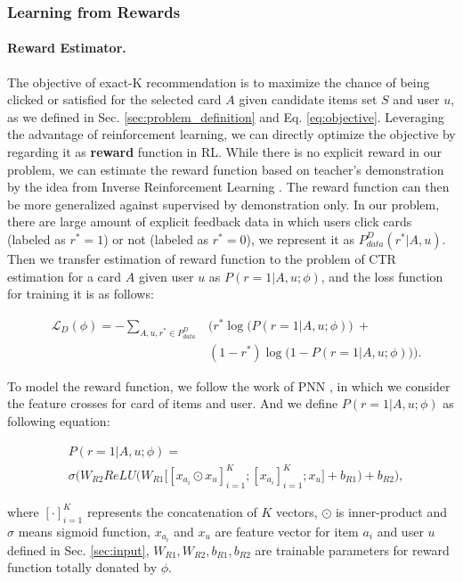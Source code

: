 \subsubsection{Learning from Rewards}
\label{sec:reinforce}
\paragraph{Reward Estimator.}
The objective of exact-K recommendation is to maximize the chance of being clicked or satisfied for the selected card $A$ given candidate items set $S$ and user $u$,
as we defined in Sec. \ref{sec:problem_definition} and Eq. \ref{eq:objective}.
Leveraging the advantage of reinforcement learning, we can directly optimize the objective by regarding it as \textbf{reward} function in RL.
While there is no explicit reward in our problem, 
we can estimate the reward function based on teacher's demonstration by the idea from Inverse Reinforcement Learning \cite{abbeel2004apprenticeship}.
The reward function can then be more generalized against supervised by demonstration only.
In our problem, there are large amount of explicit feedback data in which users click cards (labeled as $r^*=1$) or not (labeled as $r^*=0$),
we represent it as $P_{data}^{D}(r^*|A,u)$.
Then we transfer estimation of reward function to the problem of CTR estimation for a card $A$ given user $u$ as $P(r=1|A,u;\phi)$,
and the loss function for training it is as follows:
\begin{small}
\begin{eqnarray}
	& \mathcal{L}_{D}(\phi)=-\sum_{A,u,r^*\in P_{data}^{D}}&\Big(r^*\log\big(P(r=1|A,u;\phi)\big)\ + \\
	& & (1-r^*)\log\big(1-P(r=1|A,u;\phi)\big)\Big). \nonumber
\end{eqnarray}
\end{small}
To model the reward function, we follow the work of PNN \cite{qu2016product}
, in which we consider the feature crosses for card of items and user.
And we define $P(r=1|A,u;\phi)$ as following equation:
\begin{small}
\begin{eqnarray}
	& P(r=1|A,u;\phi) =  \\
	& \sigma\Big(W_{R2}ReLU\big(W_{R1}\big[[x_{a_i}\odot x_{u}]_{i=1}^{K};[x_{a_i}]_{i=1}^{K};x_{u}\big]+b_{R1}\big)+b_{R2}\Big), \nonumber
\end{eqnarray}
\end{small}
where $[\cdot]_{i=1}^{K}$ represents the concatenation of $K$ vectors, $\odot$ is inner-product and $\sigma$ means sigmoid function,
$x_{a_i}$ and $x_{u}$ are feature vector for item $a_i$ and user $u$ defined in Sec. \ref{sec:input},
$W_{R1},W_{R2},b_{R1},b_{R2}$ are trainable parameters for reward function totally donated by $\phi$.

